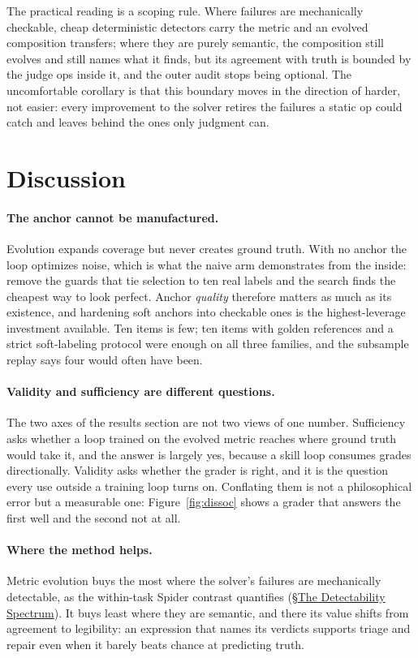 \documentclass[letterpaper]{article} %
\begin{document}
The practical reading is a scoping rule. Where failures are mechanically checkable, cheap deterministic detectors carry the metric and an evolved composition transfers; where they are purely semantic, the composition still evolves and still names what it finds, but its agreement with truth is bounded by the judge ops inside it, and the outer audit stops being optional. The uncomfortable corollary is that this boundary moves in the direction of harder, not easier: every improvement to the solver retires the failures a static op could catch and leaves behind the ones only judgment can.

\section{Discussion}

\paragraph{The anchor cannot be manufactured.}
Evolution expands coverage but never creates ground truth. With no anchor the loop optimizes noise, which is what the naive arm demonstrates from the inside: remove the guards that tie selection to ten real labels and the search finds the cheapest way to look perfect. Anchor \emph{quality} therefore matters as much as its existence, and hardening soft anchors into checkable ones is the highest-leverage investment available. Ten items is few; ten items with golden references and a strict soft-labeling protocol were enough on all three families, and the subsample replay says four would often have been.

\paragraph{Validity and sufficiency are different questions.}
The two axes of the results section are not two views of one number. Sufficiency asks whether a loop trained on the evolved metric reaches where ground truth would take it, and the answer is largely yes, because a skill loop consumes grades directionally. Validity asks whether the grader is right, and it is the question every use outside a training loop turns on. Conflating them is not a philosophical error but a measurable one: Figure~\ref{fig:dissoc} shows a grader that answers the first well and the second not at all.

\paragraph{Where the method helps.}
Metric evolution buys the most where the solver's failures are mechanically detectable, as the within-task Spider contrast quantifies (\S\hyperref[sec:detect]{The Detectability Spectrum}). It buys least where they are semantic, and there its value shifts from agreement to legibility: an expression that names its verdicts supports triage and repair even when it barely beats chance at predicting truth.
\end{document}
